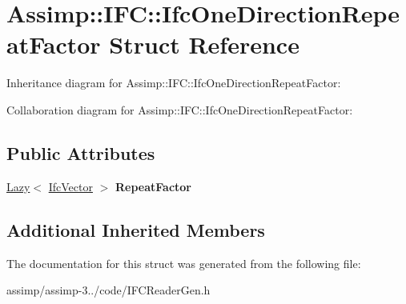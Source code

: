 \hypertarget{struct_assimp_1_1_i_f_c_1_1_ifc_one_direction_repeat_factor}{\section{Assimp\+:\+:I\+F\+C\+:\+:Ifc\+One\+Direction\+Repeat\+Factor Struct Reference}
\label{struct_assimp_1_1_i_f_c_1_1_ifc_one_direction_repeat_factor}
}


Inheritance diagram for Assimp\+:\+:I\+F\+C\+:\+:Ifc\+One\+Direction\+Repeat\+Factor\+:


Collaboration diagram for Assimp\+:\+:I\+F\+C\+:\+:Ifc\+One\+Direction\+Repeat\+Factor\+:
\subsection*{Public Attributes}
\begin{DoxyCompactItemize}
\item 
\hypertarget{struct_assimp_1_1_i_f_c_1_1_ifc_one_direction_repeat_factor_aa673494b5ed627d8a5de3c11e511b15e}{\hyperlink{struct_assimp_1_1_s_t_e_p_1_1_lazy}{Lazy}$<$ \hyperlink{struct_assimp_1_1_i_f_c_1_1_ifc_vector}{Ifc\+Vector} $>$ {\bfseries Repeat\+Factor}}\label{struct_assimp_1_1_i_f_c_1_1_ifc_one_direction_repeat_factor_aa673494b5ed627d8a5de3c11e511b15e}

\end{DoxyCompactItemize}
\subsection*{Additional Inherited Members}


The documentation for this struct was generated from the following file\+:\begin{DoxyCompactItemize}
\item 
assimp/assimp-\/3../code/I\+F\+C\+Reader\+Gen.\+h\end{DoxyCompactItemize}

